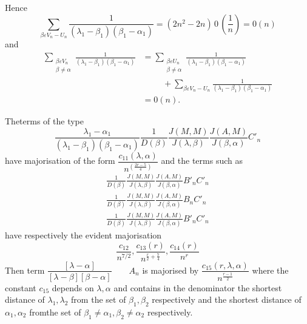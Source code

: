 Hence 
$$
\sum_{\beta \varepsilon  V_n-U_n}  \frac{1}{(\lambda_1-
    \beta_1)(\beta_1-\alpha_1)}=(2n^2-2n)\,0\,
  \left(\frac{1}{n}\right)=0(n)
$$
and
\begin{align*} 
  \sum _{\substack {\beta  \varepsilon  V_n\\{\beta \neq \alpha}}}
  \frac{1}{(\lambda_1- \beta_1)(\beta_1-\alpha_1)} & =\sum _{\substack
    {\beta  \varepsilon  U_n\\{\beta \neq
        \alpha}}}\frac{1}{(\lambda_1-\beta_1)(\beta_1-\alpha_1)}\\
  & \hspace{1cm}+ \sum_{\beta \varepsilon  V_n-U_n} \frac{1}{(\lambda_1-
    \beta_1)(\beta_1-\alpha_1)}\\ 
  & = 0(n).
\end{align*}

The\pageoriginale terms of the type
\begin{equation}
  \frac{\lambda_1- \alpha_1}{(\lambda_1- \beta_1)(\beta_1-\alpha_1)}
  \frac{1}{D(\beta)} \frac{J(M,M)}{J(\lambda,\beta)}
  \frac{J(A,M)}{J(\beta,\alpha)} C'_n \tag{17}\label{part2:chap3:sec8:eq17} 
\end{equation}
have majorisation of the form $\dfrac{c_{11}(\lambda, \alpha)}{n^{\left(\frac
  {2r-5}{4}\right)}}$ and the terms such as 
\begin{gather*}
  \frac{1}{D(\beta)} \frac{J(M,M)}{J(\lambda,\beta)}
  \frac{J(A,M)}{J(\beta,\alpha)}B'_n C'_n \tag{18}\label{part2:chap3:sec8:eq18} \\
  \frac{1}{D(\beta)} \frac{J(M,M)}{J(\lambda,\beta)}
  \frac{J(A,M)}{J(\beta,\alpha)}B_n C'_n
  \tag{19}\label{part2:chap3:sec8:eq19} \\ 
  \frac{1}{D(\beta)} \frac{J(M,M)}{J(\lambda,\beta)}
  \frac{J(A,M)}{J(\beta,\alpha)}B'_n C'_n \tag{20}\label{part2:chap3:sec8:eq20} 
\end{gather*}
have respectively the evident majorisation
$$
\frac{c_{12}}{n^{7/2}}, \frac{c_{13}(r)}{n^{\frac{r}{2}+\frac{7}{4}}},
\frac{c_{14}(r)}{n^r} 
$$
Then term $\dfrac {[\lambda-\alpha]}{[\lambda-\beta][\beta-\alpha]}
\qquad A_n$ is majorised by $\dfrac{c_{15}(r,
  \lambda,\alpha)}{n^{\frac{r-1}{2}}}$ where the constant $c_{15}$
depends on $\lambda, \alpha$ and contains in the denominator the
shortest distance of $\lambda_1,\lambda_2$ from the set of $\beta_1,
\beta_2$ respectively and the shortest distance of $\alpha_1, \alpha_2$ from\pageoriginale the
set of $\beta_1 \neq \alpha_1, \beta_2 \neq \alpha_2$ respectively. 

